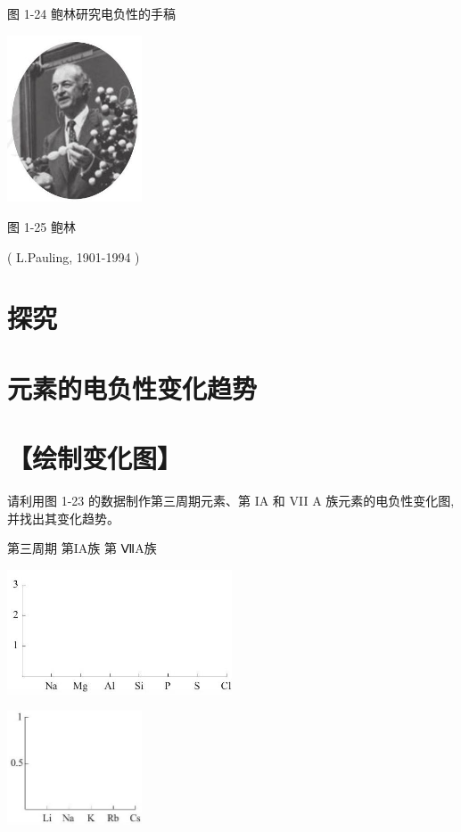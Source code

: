 \documentclass[10pt]{article}
\begin{document}
图 1-24 鲍林研究电负性的手稿

\begin{center}
\includegraphics[max width=0.3\textwidth]{images/0190e026-5a11-7df7-bd27-54d09026ba7a_28_544678.jpg}
\end{center}

图 1-25 鲍林

( L.Pauling, 1901-1994 )

\section*{探究}

\section*{元素的电负性变化趋势}

\section*{【绘制变化图】}

请利用图 1-23 的数据制作第三周期元素、第 IA 和 VII A 族元素的电负性变化图, 并找出其变化趋势。

第三周期 第IA族 第 ⅦA族

\begin{center}
\includegraphics[max width=0.5\textwidth]{images/0190e026-5a11-7df7-bd27-54d09026ba7a_29_399209.jpg}
\end{center}

\begin{center}
\includegraphics[max width=0.3\textwidth]{images/0190e026-5a11-7df7-bd27-54d09026ba7a_29_805627.jpg}
\end{center}
\end{document}
